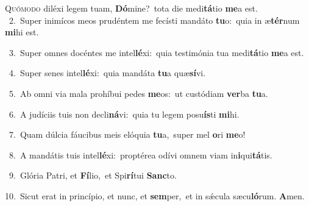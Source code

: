 \lettrine{\initial\textcolor{\initialcolor}{Q}}{uómodo} diléxi legem tuam, \textbf{Dó}\-mine?~\star tota die medi\-\textbf{tá}\-tio \textbf{me}\-a est.\\
{\numbfont\textcolor{\numbcolor}{~2.}}~Super inimícos meos prudéntem me fecísti mandáto \textbf{tu}\-o:~\star quia in æ\-\textbf{tér}\-num \textbf{mi}\-hi est.\par
{\numbfont\textcolor{\numbcolor}{~3.}}~Super omnes docéntes me intel\-\textbf{lé}\-xi:~\star quia testimónia tua medi\-\textbf{tá}\-tio \textbf{me}\-a est.\par
{\numbfont\textcolor{\numbcolor}{~4.}}~Super senes intel\-\textbf{lé}\-xi:~\star quia mandáta \textbf{tu}\-a quæ\-\textbf{sí}\-vi.\par
{\numbfont\textcolor{\numbcolor}{~5.}}~Ab omni via mala prohíbui pedes \textbf{me}\-os:~\star ut custódiam \textbf{ver}\-ba \textbf{tu}\-a.\par
{\numbfont\textcolor{\numbcolor}{~6.}}~A judíciis tuis non decli\-\textbf{ná}\-vi:~\star quia tu legem posu\-\textbf{ís}\-ti \textbf{mi}\-hi.\par
{\numbfont\textcolor{\numbcolor}{~7.}}~Quam dúlcia fáucibus meis elóquia \textbf{tu}\-a,~\star super mel \textbf{o}\-ri \textbf{me}\-o!\par
{\numbfont\textcolor{\numbcolor}{~8.}}~A mandátis tuis intel\-\textbf{lé}\-xi:~\star proptérea odívi omnem viam in\-\textbf{i}\-qui\-\textbf{tá}\-tis.\par
{\numbfont\textcolor{\numbcolor}{~9.}}~Glória Patri, et \textbf{Fí}\-lio,~\star et Spi\-\textbf{rí}\-tui \textbf{Sanc}\-to.\par
{\numbfont\textcolor{\numbcolor}{10.}}~Sicut erat in princípio, et nunc, et \textbf{sem}\-per,~\star et in sǽcula sæcu\-\textbf{ló}\-rum. \textbf{A}\-men.\par
